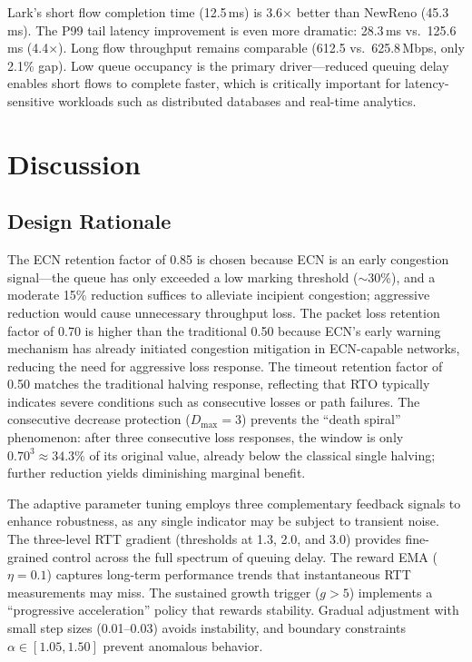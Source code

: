 \documentclass[10pt,twocolumn]{article}
\begin{document}
Lark's short flow completion time (12.5\,ms) is 3.6$\times$ better than NewReno (45.3\,ms). The P99 tail latency improvement is even more dramatic: 28.3\,ms vs.\ 125.6\,ms (4.4$\times$). Long flow throughput remains comparable (612.5 vs.\ 625.8\,Mbps, only 2.1\% gap). Low queue occupancy is the primary driver---reduced queuing delay enables short flows to complete faster, which is critically important for latency-sensitive workloads such as distributed databases and real-time analytics.

\section{Discussion}

\subsection{Design Rationale}

The ECN retention factor of 0.85 is chosen because ECN is an early congestion signal---the queue has only exceeded a low marking threshold ($\sim$30\%), and a moderate 15\% reduction suffices to alleviate incipient congestion; aggressive reduction would cause unnecessary throughput loss. The packet loss retention factor of 0.70 is higher than the traditional 0.50 because ECN's early warning mechanism has already initiated congestion mitigation in ECN-capable networks, reducing the need for aggressive loss response. The timeout retention factor of 0.50 matches the traditional halving response, reflecting that RTO typically indicates severe conditions such as consecutive losses or path failures. The consecutive decrease protection ($D_{\max}=3$) prevents the ``death spiral'' phenomenon: after three consecutive loss responses, the window is only $0.70^3 \approx 34.3\%$ of its original value, already below the classical single halving; further reduction yields diminishing marginal benefit.

The adaptive parameter tuning employs three complementary feedback signals to enhance robustness, as any single indicator may be subject to transient noise. The three-level RTT gradient (thresholds at 1.3, 2.0, and 3.0) provides fine-grained control across the full spectrum of queuing delay. The reward EMA ($\eta = 0.1$) captures long-term performance trends that instantaneous RTT measurements may miss. The sustained growth trigger ($g > 5$) implements a ``progressive acceleration'' policy that rewards stability. Gradual adjustment with small step sizes (0.01--0.03) avoids instability, and boundary constraints $\alpha \in [1.05, 1.50]$ prevent anomalous behavior.
\end{document}

